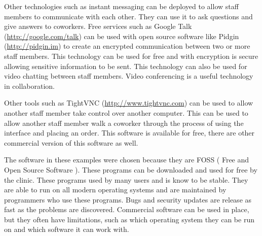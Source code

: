 \documentclass[12pt]{article}
\begin{document}
Other technologies such as instant messaging can be deployed to allow staff members to communicate with each other.  They can use it to ask questions and give answers to coworkers.  Free services such as Google Talk (\url{http://google.com/talk}) can be used with open source software like Pidgin (\url{http://pidgin.im}) to create an encrypted communication between two or more staff members.  This technology can be used for free and with encryption is secure allowing sensitive information to be sent.  This technology can also be used for video chatting between staff members.  Video conferencing is a useful technology in collaboration.

Other tools such as TightVNC (\url{http://www.tightvnc.com}) can be used to allow another staff member take control over another computer.  This can be used to allow another staff member walk a coworker through the process of using the interface and placing an order.  This software is available for free, there are other commercial version of this software as well.

The software in these examples were chosen because they are FOSS ( Free and Open Source Software ).  These programs can be downloaded and used for free by the clinic.  These programs used by many users and is know to be stable.  They are able to run on all modern operating systems and are maintained by programmers who use these programs.  Bugs and security updates are release as fast as the problems are discovered.  Commercial software can be used in place, but they often have limitations, such as which operating system they can be run on and which software it can work with. 
\end{document}
